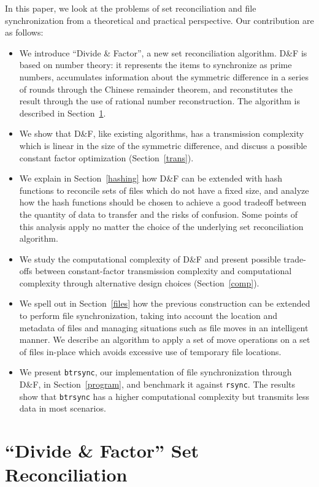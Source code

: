 \documentclass[11pt]{llncs}
\newcommand{\df}{D\&F\xspace}
\newcommand{\btrsync}{\texttt{btrsync}\xspace}
\newcommand{\rsync}{\texttt{rsync}\xspace}
\begin{document}
In this paper, we look at the problems of set reconciliation and file
synchronization from a theoretical and practical perspective. Our contribution
are as follows:
\begin{itemize}
  \item We introduce ``Divide \& Factor'', a new set reconciliation algorithm.
    \df is based on number theory: it represents the items to synchronize as
    prime numbers, accumulates information about the symmetric difference in
    a series of rounds through the Chinese remainder theorem, and reconstitutes
    the result through the use of rational number reconstruction. The algorithm
    is described in Section~\ref{dandf}.
  \item We show that \df, like existing algorithms, has a transmission
    complexity which is linear in the size of the symmetric difference, and discuss a possible constant factor optimization
    (Section~\ref{trans}).
  \item We explain in Section~\ref{hashing} how \df can be extended with hash
    functions to reconcile sets of files which do not have a fixed size, and
    analyze how the hash functions should be chosen to achieve a good tradeoff
    between the quantity of data to transfer and the risks of confusion. Some
    points of this analysis apply no matter the choice of the underlying set
    reconciliation algorithm.
  \item We study the computational complexity of \df and
    present possible trade-offs between constant-factor transmission complexity
    and computational complexity through alternative design choices
    (Section~\ref{comp}).
  \item We spell out in Section~\ref{files} how the previous construction can be
    extended to perform file synchronization, taking into account the location
    and metadata of files and managing situations such as file moves in an
    intelligent manner. We describe an algorithm to apply a set of move
    operations on a set of files in-place which avoids excessive use of
    temporary file locations.
  \item We present \btrsync, our implementation of file synchronization through
    \df, in Section~\ref{program}, and benchmark it against \rsync. The results
    show that \btrsync has a higher computational complexity but transmits less
    data in most scenarios.
\end{itemize}

\section{``Divide \& Factor'' Set Reconciliation}
\label{dandf}
\end{document}
